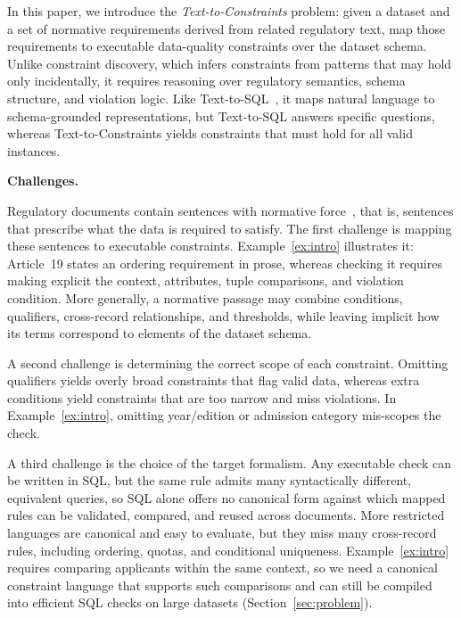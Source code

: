 In this paper, we introduce the \emph{Text-to-Constraints} problem: given a dataset and a set of normative requirements derived from related regulatory text, map those requirements to executable data-quality constraints over the dataset schema.  Unlike constraint discovery, which infers constraints from patterns that may hold only incidentally, it requires reasoning over regulatory semantics, schema structure, and violation logic. Like Text-to-SQL~\cite{llmTEXT2SQLSurvey2025}, it maps natural language to schema-grounded representations, but Text-to-SQL answers specific questions, whereas Text-to-Constraints yields constraints that must hold for all valid instances.  %

\smallskip
\noindent\textbf{Challenges.}

Regulatory documents contain sentences with normative force~\cite{https://doi.org/10.1111/jels.12364}, that is, sentences that prescribe what the data is required to satisfy. The first challenge is mapping these sentences to executable constraints. Example~\ref{ex:intro} illustrates it: Article~19 states an ordering requirement in prose, whereas checking it requires making explicit the context, attributes, tuple comparisons, and violation condition. More generally, a normative passage may combine conditions, qualifiers, cross-record relationships, and thresholds, while leaving implicit how its terms correspond to elements of the dataset schema.

A second challenge is determining the correct scope of each constraint. Omitting qualifiers yields overly broad constraints that flag valid data, whereas extra conditions yield constraints that are too narrow and miss violations. In Example~\ref{ex:intro}, omitting year/edition or admission category mis-scopes the check. 

A third challenge is the choice of the target formalism. Any executable check can be written in SQL, but the same rule admits many syntactically different, equivalent queries, so SQL alone offers no canonical form against which mapped rules can be validated, compared, and reused across documents. More restricted languages are canonical and easy to evaluate, but they miss many cross-record rules, including ordering, quotas, and conditional uniqueness. Example~\ref{ex:intro} requires comparing applicants within the same context, so we need a canonical constraint language that supports such comparisons and can still be compiled into efficient SQL checks on large datasets (Section~\ref{sec:problem}).

